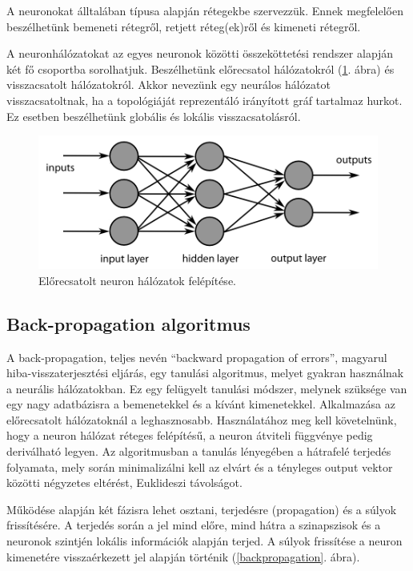 \documentclass[a4paper]{article}
\begin{document}
A neuronokat álltalában típusa alapján rétegekbe szervezzük. Ennek megfelelően beszélhetünk bemeneti rétegről, retjett réteg(ek)ről és kimeneti rétegről.

A neuronhálózatokat az egyes neuronok közötti összeköttetési rendszer alapján két fő csoportba sorolhatjuk. Beszélhetünk előrecsatol hálózatokról (\ref{forward_neuron}. ábra) és visszacsatolt hálózatokról. Akkor nevezünk egy neurálos hálózatot visszacsatoltnak, ha a topológiáját reprezentáló irányított gráf tartalmaz hurkot. Ez esetben beszélhetünk globális és lokális visszacsatolásról.

\begin{figure}
  \centering
  \includegraphics[scale=0.3]{neuron_layers}
  \caption{Előrecsatolt neuron hálózatok felépítése.}
  \label{forward_neuron}
\end{figure}

\subsection{Back-propagation algoritmus}
A back-propagation, teljes nevén ``backward propagation of errors'', magyarul hiba-visszaterjesztési eljárás, egy tanulási algoritmus, melyet gyakran használnak a neurális hálózatokban. Ez egy felügyelt tanulási módszer, melynek szüksége van egy nagy adatbázisra a bemenetekkel és a kívánt kimenetekkel. Alkalmazása az előrecsatolt hálózatoknál a leghasznosabb. Használatához meg kell követelnünk, hogy a neuron hálózat réteges felépítésű, a neuron átviteli függvénye pedig deriválható legyen. Az algoritmusban a tanulás lényegében a hátrafelé terjedés folyamata, mely során minimalizálni kell az elvárt és a tényleges output vektor közötti négyzetes eltérést, Euklideszi távolságot.

Működése alapján két fázisra lehet osztani, terjedésre (propagation) és a súlyok frissítésére. A terjedés során a jel mind előre, mind hátra a szinapszisok és a neuronok szintjén lokális információk alapján terjed. A súlyok frissítése a neuron kimenetére visszaérkezett jel alapján történik (\ref{backpropagation}. ábra).
\end{document}
